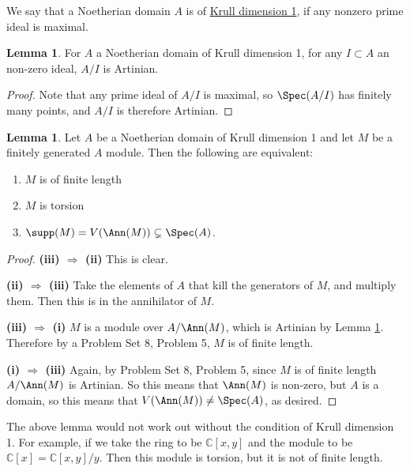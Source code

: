 \documentclass[12 pt]{article}
\theoremstyle{definition}
\newtheorem{lemma}[theorem]{Lemma}
\newcommand\cc{\mathbb{C}}
\begin{document}
\begin{definition} We say that a Noetherian domain $A$ is of \underline{Krull dimension 1}, if any nonzero prime ideal is maximal.
\end{definition}

\begin{lemma} For $A$ a Noetherian domain of Krull dimension 1, for any $I \subset A$ an  non-zero ideal, $A/I$ is Artinian.
\label{quot of Krull-dim-1 is Artinian}
\end{lemma}
\begin{proof} Note that any prime ideal of $A/I$ is maximal, so $\Spec(A/I)$ has finitely many points, and $A/I$ is therefore Artinian. 
\end{proof}


\begin{lemma} Let $A$ be a Noetherian domain of Krull dimension 1 and let $M$ be a finitely generated $A$ module. Then the following are equivalent:
\begin{enumerate}
\item $M$ is of finite length
\item $M$ is torsion
\item $\supp(M)=V(\Ann(M)) \subsetneq \Spec(A)$.
\end{enumerate}
\label{Noeth, Krull 1 means fin. len iff torsion iff V(ann) neq Spec(A)}
\end{lemma}
\begin{proof}
\noindent \textbf{(iii) $\Rightarrow$ (ii)} This is clear. 

\noindent \textbf{(ii) $\Rightarrow$ (iii)} Take the elements of $A$ that kill the generators of $M$, and multiply them. Then this is in the annihilator of $M$.

\noindent \textbf{(iii) $\Rightarrow$ (i)} $M$ is a module over $A/\Ann(M)$, which is Artinian by Lemma \ref{quot of Krull-dim-1 is Artinian}. Therefore by a Problem Set 8, Problem 5, $M$ is of finite length.

\noindent \textbf{(i) $\Rightarrow$ (iii)} Again, by Problem Set 8, Problem 5, since $M$ is of finite length $A/\Ann(M)$ is Artinian. So this means that $\Ann(M)$ is non-zero, but $A$ is a domain, so this means that $V(\Ann(M)) \neq \Spec(A)$, as desired.
\end{proof}


The above lemma would not work out without the condition of Krull dimension 1. For example, if we take the ring to be $\cc[x,y]$ and the module to be $\cc[x]=\cc[x,y]/y$. Then this module is torsion, but it is not of finite length.
\end{document}
